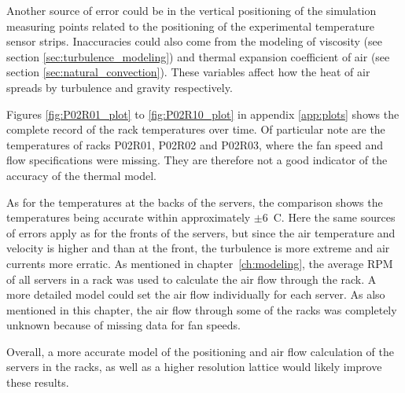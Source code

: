 Another source of error could be in the vertical positioning of the simulation measuring points related to the positioning of the experimental temperature sensor strips. Inaccuracies could also come from the modeling of viscosity (see section \ref{sec:turbulence_modeling}) and thermal expansion coefficient of air (see section \ref{sec:natural_convection}). These variables affect how the heat of air spreads by turbulence and gravity respectively.

Figures \ref{fig:P02R01_plot} to \ref{fig:P02R10_plot} in appendix \ref{app:plots} shows the complete record of the rack temperatures over time. Of particular note are the temperatures of racks P02R01, P02R02 and P02R03, where the fan speed and flow specifications were missing. They are therefore not a good indicator of the accuracy of the thermal model.

As for the temperatures at the backs of the servers, the comparison shows the temperatures being accurate within approximately $\pm 6$~\degree C. Here the same sources of errors apply as for the fronts of the servers, but since the air temperature and velocity is higher and than at the front, the turbulence is more extreme and air currents more erratic. As mentioned in chapter~\ref{ch:modeling}, the average RPM of all servers in a rack was used to calculate the air flow through the rack. A more detailed model could set the air flow individually for each server. As also mentioned in this chapter, the air flow through some of the racks was completely unknown because of missing data for fan speeds. 

Overall, a more accurate model of the positioning and air flow calculation of the servers in the racks, as well as a higher resolution lattice would likely improve these results. 


